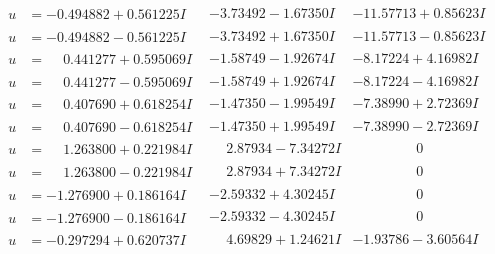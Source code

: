 \documentclass[1p]{elsarticle_modified}
\theoremstyle{definition}
\begin{document}
$$\begin{array}{c|c|c}
\begin{aligned}
u &= -0.494882 + 0.561225 I\end{aligned}
 & -3.73492 - 1.67350 I & -11.57713 + 0.85623 I \\ \hline\begin{aligned}
u &= -0.494882 - 0.561225 I\end{aligned}
 & -3.73492 + 1.67350 I & -11.57713 - 0.85623 I \\ \hline\begin{aligned}
u &= \phantom{-}0.441277 + 0.595069 I\end{aligned}
 & -1.58749 - 1.92674 I & -8.17224 + 4.16982 I \\ \hline\begin{aligned}
u &= \phantom{-}0.441277 - 0.595069 I\end{aligned}
 & -1.58749 + 1.92674 I & -8.17224 - 4.16982 I \\ \hline\begin{aligned}
u &= \phantom{-}0.407690 + 0.618254 I\end{aligned}
 & -1.47350 - 1.99549 I & -7.38990 + 2.72369 I \\ \hline\begin{aligned}
u &= \phantom{-}0.407690 - 0.618254 I\end{aligned}
 & -1.47350 + 1.99549 I & -7.38990 - 2.72369 I \\ \hline\begin{aligned}
u &= \phantom{-}1.263800 + 0.221984 I\end{aligned}
 & \phantom{-}2.87934 - 7.34272 I & \phantom{-0.000000 } 0 \\ \hline\begin{aligned}
u &= \phantom{-}1.263800 - 0.221984 I\end{aligned}
 & \phantom{-}2.87934 + 7.34272 I & \phantom{-0.000000 } 0 \\ \hline\begin{aligned}
u &= -1.276900 + 0.186164 I\end{aligned}
 & -2.59332 + 4.30245 I & \phantom{-0.000000 } 0 \\ \hline\begin{aligned}
u &= -1.276900 - 0.186164 I\end{aligned}
 & -2.59332 - 4.30245 I & \phantom{-0.000000 } 0 \\ \hline\begin{aligned}
u &= -0.297294 + 0.620737 I\end{aligned}
 & \phantom{-}4.69829 + 1.24621 I & -1.93786 - 3.60564 I \\ \hline\begin{aligned}

\end{aligned}
\end{array}$$
\end{document}
